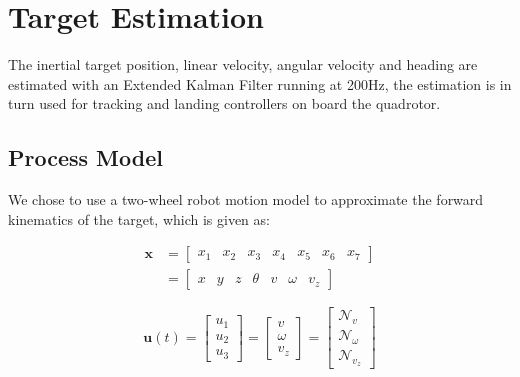 \documentclass[letterpaper, 10 pt, conference]{ieeeconf}
\begin{document}
\section{Target Estimation}
The inertial target position, linear velocity, angular velocity and
heading are estimated with an Extended Kalman Filter running at 200Hz, the
estimation is in turn used for tracking and landing controllers on board
the quadrotor.

\subsection{Process Model}
We chose to use a two-wheel robot motion model to approximate the forward
kinematics of the target, which is given as:

\begin{equation}
    \begin{split}
        \textbf{x}
        &= \begin{bmatrix}
            x_{1} & x_{2} & x_{3} & x_{4} & x_{5} & x_{6} & x_{7}
        \end{bmatrix} \\
        &=
        \begin{bmatrix}
            x & y & z & \theta & v & \omega & v_{z}
        \end{bmatrix}
    \end{split}
\end{equation}

\begin{equation}
    \textbf{u}(t)
        = \begin{bmatrix}
            u_{1} \\
            u_{2} \\
            u_{3}
        \end{bmatrix}
        = \begin{bmatrix}
            v \\
            \omega \\
            v_{z}
        \end{bmatrix}
        = \begin{bmatrix}
            \mathcal{N}_{v} \\
            \mathcal{N}_{\omega} \\
            \mathcal{N}_{v_{z}}
        \end{bmatrix}
\end{equation}
\end{document}
